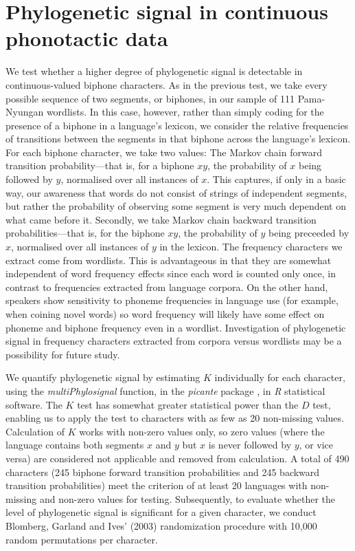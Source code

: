 \hypertarget{phy-sig-cont}{%
\section{Phylogenetic signal in continuous phonotactic data}\label{phy-sig-cont}}

We test whether a higher degree of phylogenetic signal is detectable in continuous-valued biphone characters. As in the previous test, we take every possible sequence of two segments, or biphones, in our sample of 111 Pama-Nyungan wordlists. In this case, however, rather than simply coding for the presence of a biphone in a language's lexicon, we consider the relative frequencies of transitions between the segments in that biphone across the language's lexicon. For each biphone character, we take two values: The Markov chain forward transition probability---that is, for a biphone \(xy\), the probability of \(x\) being followed by \(y\), normalised over all instances of \(x\). This captures, if only in a basic way, our awareness that words do not consist of strings of independent segments, but rather the probability of observing some segment is very much dependent on what came before it. Secondly, we take Markov chain backward transition probabilities---that is, for the biphone \(xy\), the probability of \(y\) being preceeded by \(x\), normalised over all instances of \(y\) in the lexicon. The frequency characters we extract come from wordlists. This is advantageous in that they are somewhat independent of word frequency effects since each word is counted only once, in contrast to frequencies extracted from language corpora. On the other hand, speakers show sensitivity to phoneme frequencies in language use (for example, when coining novel words) \autocites{coleman_stochastic_1997}{zuraw_patterned_2000}{ernestus_predicting_2003}{albright_rules_2003}{eddington_spanish_2004}{hayes_stochastic_2006}{gordon_phonological_2016} so word frequency will likely have some effect on phoneme and biphone frequency even in a wordlist. Investigation of phylogenetic signal in frequency characters extracted from corpora versus wordlists may be a possibility for future study.

We quantify phylogenetic signal by estimating \(K\) \autocite{blomberg_testing_2003} individually for each character, using the \emph{multiPhylosignal} function, in the \emph{picante} package \autocite{kembel_picante:_2010}, in \emph{R} statistical software. The \(K\) test has somewhat greater statistical power than the \(D\) test, enabling us to apply the test to characters with as few as 20 non-missing values. Calculation of \(K\) works with non-zero values only, so zero values (where the language contains both segments \(x\) and \(y\) but \(x\) is never followed by \(y\), or vice versa) are considered not applicable and removed from calculation. A total of 490 characters (245 biphone forward transition probabilities and 245 backward transition probabilities) meet the criterion of at least 20 languages with non-missing and non-zero values for testing. Subsequently, to evaluate whether the level of phylogenetic signal is significant for a given character, we conduct Blomberg, Garland and Ives' (2003) randomization procedure with 10,000 random permutations per character.

